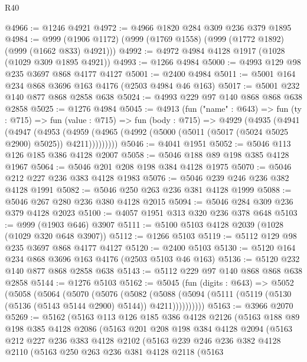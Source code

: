 \begin{lexlean}{R40}
\begin{coremodule}
@4966 := @1246 @4921
@4972 := @4966 @1820 @284 @309 @236 @379 @1895
@4984 := @999 (@1906 @1172) (@999 (@1769 @1558) (@999 (@1772 @1892) (@999 (@1662 @833) @4921)))
@4992 := @4972 @4984 @4128 @1917 (@1028 (@1029 @309 @1895 @4921))
@4993 := @1266 @4984
@5000 := @4993 @129 @98 @235 @3697 @868 @4177 @4127
@5001 := @2400 @4984
@5011 := @5001 @164 @234 @868 @3696 @163 @4176 (@2503 @4984 @46 @163)
@5017 := @5001 @232 @140 @877 @868 @2858 @638
@5024 := @4993 @229 @97 @140 @868 @868 @638 @2858
@5025 := @1276 @4984
@5045 := @4913
    (fun ("name" : @643) =>
    fun (ty : @715) =>
    fun (value : @715) =>
    fun (body : @715) =>
    @4929
      (@4935
        (@4941
          (@4947
            (@4953
              (@4959 (@4965 (@4992 (@5000 (@5011 (@5017 (@5024 @5025 @2900) @5025)) @4211)))))))))
@5046 := @4041 @1951
@5052 := @5046 @113 @126 @185 @386 @4128 @2007
@5058 := @5046 @188 @89 @198 @385 @4128 @1967
@5064 := @5046 @201 @208 @198 @384 @4128 @1975
@5070 := @5046 @212 @227 @236 @383 @4128 @1983
@5076 := @5046 @239 @246 @236 @382 @4128 @1991
@5082 := @5046 @250 @263 @236 @381 @4128 @1999
@5088 := @5046 @267 @280 @236 @380 @4128 @2015
@5094 := @5046 @284 @309 @236 @379 @4128 @2023
@5100 := @4057 @1951 @313 @320 @236 @378 @648
@5103 := @999 (@1903 @646) @3907
@5111 := @5100 @5103 @4128 @2039 (@1028 (@1029 @320 @648 @3907))
@5112 := @1266 @5103
@5119 := @5112 @129 @98 @235 @3697 @868 @4177 @4127
@5120 := @2400 @5103
@5130 := @5120 @164 @234 @868 @3696 @163 @4176 (@2503 @5103 @46 @163)
@5136 := @5120 @232 @140 @877 @868 @2858 @638
@5143 := @5112 @229 @97 @140 @868 @868 @638 @2858
@5144 := @1276 @5103
@5162 := @5045
    (fun (digits : @643) =>
    @5052
      (@5058
        (@5064
          (@5070
            (@5076
              (@5082
                (@5088
                  (@5094 (@5111 (@5119 (@5130 (@5136 (@5143 @5144 @2900) @5144)) @4211))))))))))
@5163 := @3966 @2070
@5269 := @5162
    (@5163
      @113
      @126
      @185
      @386
      @4128
      @2126
      (@5163
        @188
        @89
        @198
        @385
        @4128
        @2086
        (@5163
          @201
          @208
          @198
          @384
          @4128
          @2094
          (@5163
            @212
            @227
            @236
            @383
            @4128
            @2102
            (@5163
              @239
              @246
              @236
              @382
              @4128
              @2110
              (@5163
                @250
                @263
                @236
                @381
                @4128
                @2118
                (@5163

\end{coremodule}
\end{lexlean}

